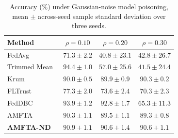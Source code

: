 \begin{table}[H]
	\caption{Accuracy (\%) under Gaussian-noise model poisoning, mean $\pm$ across-seed sample standard deviation over three seeds.}
	\label{tab:gaussian}
	\centering
	\begin{tabular}{@{}lccc@{}}
		\toprule
		\textbf{Method} & $\rho=0.10$ & $\rho=0.20$ & $\rho=0.30$\\
		\midrule
		FedAvg~\cite{mcmahan2017communication} & $71.3\pm2.2$ & $40.8\pm23.1$ & $42.8\pm26.7$\\
		Trimmed Mean~\cite{yin2018byzantine} & $\mathbf{94.4}\pm1.0$ & $57.0\pm25.6$ & $41.5\pm24.4$\\
		Krum~\cite{blanchard2017byzantine} & $90.0\pm0.5$ & $89.9\pm0.9$ & $90.3\pm0.2$\\
		FLTrust~\cite{cao2021fltrust} & $77.3\pm2.0$ & $73.6\pm2.4$ & $70.3\pm2.3$\\
		FedDBC~\cite{feddbc2026} & $93.9\pm1.2$ & $\mathbf{92.8}\pm1.7$ & $65.3\pm11.3$\\
		AMFTA & $90.3\pm1.1$ & $89.5\pm1.1$ & $89.3\pm0.8$\\
		\textbf{AMFTA-ND} & $90.9\pm1.1$ & $90.6\pm1.4$ & $\mathbf{90.6}\pm1.1$\\
		\bottomrule
	\end{tabular}
\end{table}

